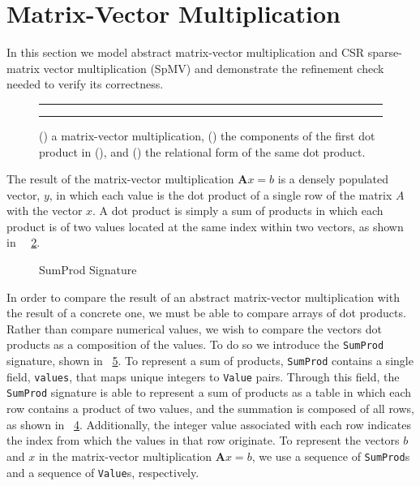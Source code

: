 \section{Matrix-Vector Multiplication}
\label{sec:spmv}

In this section we model abstract matrix-vector multiplication and CSR sparse-matrix vector multiplication (SpMV) and demonstrate the refinement check needed to verify its correctness.

\begin{figure}
\begin{subfigure}[b]{0.5\textwidth}
  \centering
  
  \caption{}
  \label{fig:mvm}
\end{subfigure}
{\color{lightgray}\rule{0.4\textwidth}{0.1pt}}
\par\bigskip
\begin{subfigure}[b]{0.5\textwidth}
  \centering
  
  \caption{}
  \label{fig:dp}
\end{subfigure}
{\color{lightgray}\rule{0.4\textwidth}{0.1pt}}
\par\bigskip
\begin{subfigure}[b]{0.5\textwidth}
  \centering
  
  \caption{}
  \label{fig:dpt}
\end{subfigure}
\caption{() a matrix-vector multiplication, () the components of the first dot product in (), and () the relational form of the same dot product.}
\end{figure}

The result of the matrix-vector multiplication $\bm{A}x = b$ is a densely populated vector, $y$, in which each value is the dot product of a single row of the matrix $A$ with the vector $x$.  A dot product is simply a sum of products in which each product is of two values located at the same index within two vectors, as shown in ~\figurename~\ref{fig:dp}.

\begin{figure}

\caption{SumProd Signature}
\label{model:sumprod}
\end{figure}

In order to compare the result of an abstract matrix-vector multiplication with the result of a concrete one, we must be able to compare arrays of dot products.  Rather than compare numerical values, we wish to compare the vectors dot products as a composition of the values.  To do so we introduce the \texttt{SumProd} signature, shown in \figurename~\ref{model:sumprod}.  To represent a sum of products, \texttt{SumProd} contains a single field, \texttt{values}, that maps unique integers to \texttt{Value} pairs. Through this field, the \texttt{SumProd} signature is able to represent a sum of products as a table in which each row contains a product of two values, and the summation is composed of all rows, as shown in \figurename~\ref{fig:dpt}.  Additionally, the integer value associated with each row indicates the index from which the values in that row originate.  To represent the vectors $b$ and $x$ in the matrix-vector multiplication $\bm{A}x = b$, we use a sequence of \texttt{SumProd}s and a sequence of \texttt{Value}s, respectively.

